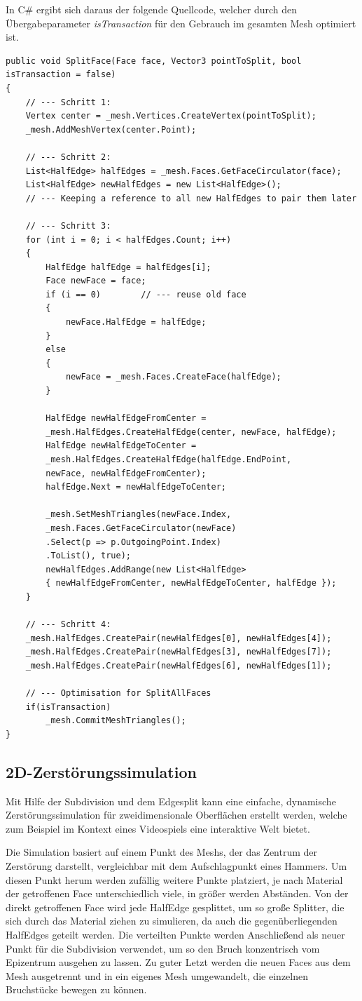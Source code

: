 In C\# ergibt sich daraus der folgende Quellcode, welcher durch den \"Ubergabeparameter \textit{isTransaction} f\"ur den Gebrauch im gesamten Mesh optimiert ist.
\begin{lstlisting}
public void SplitFace(Face face, Vector3 pointToSplit, bool isTransaction = false)
{
	// --- Schritt 1:
	Vertex center = _mesh.Vertices.CreateVertex(pointToSplit);
	_mesh.AddMeshVertex(center.Point);

	// --- Schritt 2:
	List<HalfEdge> halfEdges = _mesh.Faces.GetFaceCirculator(face);
	List<HalfEdge> newHalfEdges = new List<HalfEdge>(); 
	// --- Keeping a reference to all new HalfEdges to pair them later

	// --- Schritt 3:
	for (int i = 0; i < halfEdges.Count; i++)
	{
		HalfEdge halfEdge = halfEdges[i];
		Face newFace = face;
		if (i == 0)        // --- reuse old face
		{
			newFace.HalfEdge = halfEdge;
		}
		else
		{
			newFace = _mesh.Faces.CreateFace(halfEdge);
		}

		HalfEdge newHalfEdgeFromCenter =
		_mesh.HalfEdges.CreateHalfEdge(center, newFace, halfEdge);
		HalfEdge newHalfEdgeToCenter =
		_mesh.HalfEdges.CreateHalfEdge(halfEdge.EndPoint, 
		newFace, newHalfEdgeFromCenter);
		halfEdge.Next = newHalfEdgeToCenter;

		_mesh.SetMeshTriangles(newFace.Index,
		_mesh.Faces.GetFaceCirculator(newFace)
		.Select(p => p.OutgoingPoint.Index)
		.ToList(), true);
		newHalfEdges.AddRange(new List<HalfEdge>
		{ newHalfEdgeFromCenter, newHalfEdgeToCenter, halfEdge });
	}
	
	// --- Schritt 4:
	_mesh.HalfEdges.CreatePair(newHalfEdges[0], newHalfEdges[4]);
	_mesh.HalfEdges.CreatePair(newHalfEdges[3], newHalfEdges[7]);
	_mesh.HalfEdges.CreatePair(newHalfEdges[6], newHalfEdges[1]);

	// --- Optimisation for SplitAllFaces
	if(isTransaction)
		_mesh.CommitMeshTriangles();
}
\end{lstlisting}

\subsection {2D-Zerst\"orungssimulation}
Mit Hilfe der Subdivision und dem Edgesplit kann eine einfache, dynamische Zerst\"orungs\-simulation f\"ur zweidimensionale Oberfl\"achen erstellt werden, welche zum Beispiel im Kontext eines Videospiels eine interaktive Welt bietet. 

Die Simulation basiert auf einem Punkt des Meshs, der das Zentrum der Zerst\"orung darstellt, vergleichbar mit dem Aufschlagpunkt eines Hammers. Um diesen Punkt herum werden zuf\"allig weitere Punkte platziert, je nach Material der getroffenen Face unterschiedlich viele, in gr\"o{\ss}er werden Abst\"anden. Von der direkt getroffenen Face wird jede HalfEdge gesplittet, um so gro{\ss}e Splitter, die sich durch das Material ziehen zu simulieren, da auch die gegen\"uberliegenden HalfEdges geteilt werden. Die verteilten Punkte werden Anschlie{\ss}end als neuer Punkt f\"ur die Subdivision verwendet, um so den Bruch konzentrisch vom Epizentrum ausgehen zu lassen. Zu guter Letzt werden die neuen Faces aus dem Mesh ausgetrennt und in ein eigenes Mesh umgewandelt, die einzelnen Bruchst\"ucke bewegen zu k\"onnen.

